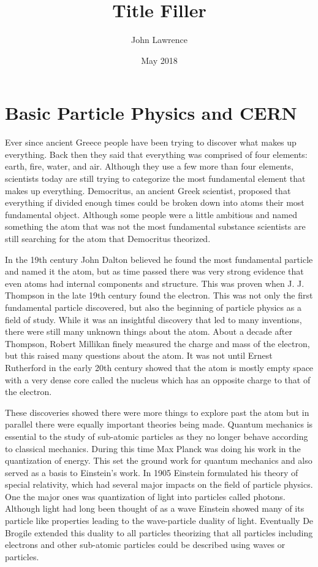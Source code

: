 \documentclass
[]
{thesis}
\title{Title Filler}
\author{John Lawrence}
\date{May 2018}
\begin{document}
	
\chapter{Basic Particle Physics and CERN}
\label{chap:one}
	
Ever since ancient Greece people have been trying to discover what makes up everything. Back then they said that everything was comprised of four elements: earth, fire, water, and air. Although they use a few more than four elements, scientists today are still trying to categorize the most fundamental element that makes up everything. Democritus, an ancient Greek scientist, proposed that everything if divided enough times could be broken down into atoms their most fundamental object. Although some people were a little ambitious and named something the atom that was not the most fundamental substance scientists are still searching for the atom that Democritus theorized. 

In the 19th century John Dalton believed he found the most fundamental particle and named it the atom, but as time passed there was very strong evidence that even atoms had internal components and structure. This was proven when J. J. Thompson in the late 19th century found the electron. This was not only the first fundamental particle discovered, but also the beginning of particle physics as a field of study. While it was an insightful discovery that led to many inventions, there were still many unknown things about the atom. About a decade after Thompson, Robert Millikan finely measured the charge and mass of the electron, but this raised many questions about the atom. It was not until Ernest Rutherford in the early 20th century showed that the atom is mostly empty space with a very dense core called the nucleus which has an opposite charge to that of the electron.

These discoveries showed there were more things to explore past the atom but in parallel there were equally important theories being made. Quantum mechanics is essential to the study of sub-atomic particles as they no longer behave according to classical mechanics. During this time Max Planck was doing his work in the quantization of energy. This set the ground work for quantum mechanics and also served as a basis to Einstein's work. In 1905 Einstein formulated his theory of special relativity, which had several major impacts on the field of particle physics. One the major ones was quantization of light into particles called photons. Although light had long been thought of as a wave Einstein showed many of its particle like properties leading to the wave-particle duality of light. Eventually De Brogile extended this duality to all particles theorizing that all particles including electrons and other sub-atomic particles could be described using waves or particles.
\end{document}
